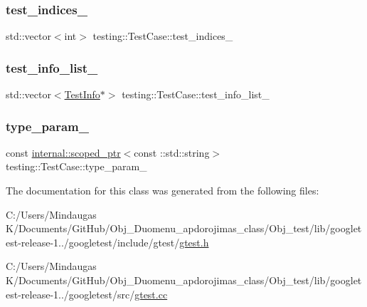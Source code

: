 \mbox{\label{classtesting_1_1_test_case_a6bb04b98c46a3eecf7a4e6f62593a827}} 
\subsubsection{\texorpdfstring{test\_indices\_}{test\_indices\_}}
{\footnotesize\ttfamily std\+::vector$<$int$>$ testing\+::\+Test\+Case\+::test\+\_\+indices\+\_\+\hspace{0.3cm}{\ttfamily [private]}}

\mbox{\label{classtesting_1_1_test_case_adce272a48399dd67a7bdd14fa7e99b80}} 
\subsubsection{\texorpdfstring{test\_info\_list\_}{test\_info\_list\_}}
{\footnotesize\ttfamily std\+::vector$<$\mbox{\hyperlink{classtesting_1_1_test_info}{Test\+Info}}$\ast$$>$ testing\+::\+Test\+Case\+::test\+\_\+info\+\_\+list\+\_\+\hspace{0.3cm}{\ttfamily [private]}}

\mbox{\label{classtesting_1_1_test_case_a4952403fca9baa20275b3fcdc28977db}} 
\subsubsection{\texorpdfstring{type\_param\_}{type\_param\_}}
{\footnotesize\ttfamily const \mbox{\hyperlink{classtesting_1_1internal_1_1scoped__ptr}{internal\+::scoped\+\_\+ptr}}$<$const \+::std\+::string$>$ testing\+::\+Test\+Case\+::type\+\_\+param\+\_\+\hspace{0.3cm}{\ttfamily [private]}}



The documentation for this class was generated from the following files\+:\begin{DoxyCompactItemize}
\item 
C\+:/\+Users/\+Mindaugas K/\+Documents/\+Git\+Hub/\+Obj\+\_\+\+Duomenu\+\_\+apdorojimas\+\_\+class/\+Obj\+\_\+test/lib/googletest-\/release-\/1../googletest/include/gtest/\mbox{\hyperlink{_obj__test_2lib_2googletest-release-1_88_81_2googletest_2include_2gtest_2gtest_8h}{gtest.\+h}}\item 
C\+:/\+Users/\+Mindaugas K/\+Documents/\+Git\+Hub/\+Obj\+\_\+\+Duomenu\+\_\+apdorojimas\+\_\+class/\+Obj\+\_\+test/lib/googletest-\/release-\/1../googletest/src/\mbox{\hyperlink{_obj__test_2lib_2googletest-release-1_88_81_2googletest_2src_2gtest_8cc}{gtest.\+cc}}\end{DoxyCompactItemize}
